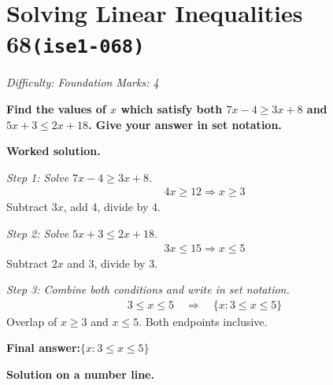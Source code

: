 \documentclass[11pt]{article}
\newcommand{\question}[1]{\par\medskip\noindent\textbf{#1}\par}
\begin{document}
\section*{Solving Linear Inequalities 68\quad\small\texttt{(ise1-068)}}
\textit{Difficulty: Foundation \quad\textbar\quad Marks: 4}

\question{Find the values of \( x \) which satisfy both \( 7x - 4 \geq 3x + 8 \) and \( 5x + 3 \leq 2x + 18 \). Give your answer in set notation.}

\textbf{Worked solution.}

\textit{Step 1: Solve \( 7x - 4 \geq 3x + 8 \).}
\[\begin{gathered}
4x \geq 12 \Rightarrow x \geq 3
\end{gathered}\]
Subtract \( 3x \), add 4, divide by 4.

\textit{Step 2: Solve \( 5x + 3 \leq 2x + 18 \).}
\[\begin{gathered}
3x \leq 15 \Rightarrow x \leq 5
\end{gathered}\]
Subtract \( 2x \) and 3, divide by 3.

\textit{Step 3: Combine both conditions and write in set notation.}
\[\begin{gathered}
3 \leq x \leq 5 \quad \Rightarrow \quad \{x : 3 \leq x \leq 5\}
\end{gathered}\]
Overlap of \( x \geq 3 \) and \( x \leq 5 \). Both endpoints inclusive.

\begin{answerbox}
\textbf{Final answer:}\quad \(\displaystyle  \{x : 3 \leq x \leq 5\} \)
\end{answerbox}
\textbf{Solution on a number line.}
\end{document}
